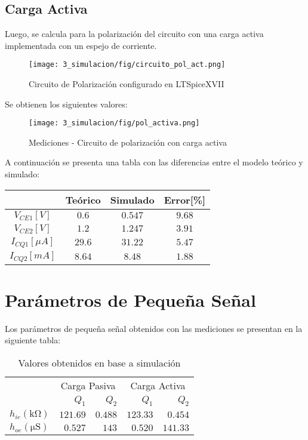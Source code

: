 \subsection{Carga Activa}

Luego, se calcula  para la polarización del circuito con una carga activa implementada con un espejo de corriente.

\begin{figure}[H]
    \centering
    \texttt{[image: 3\_simulacion/fig/circuito\_pol\_act.png]}
    \label{circuito_pol_activa}
    \caption{Circuito de Polarización configurado en LTSpiceXVII}
\end{figure}

Se obtienen los siguientes valores:

\begin{figure}[H]
    \centering
    \texttt{[image: 3\_simulacion/fig/pol\_activa.png]}
    \label{mediciones_pol_activa}
    \caption{Mediciones - Circuito de polarización con carga activa}
\end{figure}
A continuación se presenta una tabla con las diferencias entre el modelo teórico y simulado:

\begin{table}[H]
    \centering
    \begin{tabular}{|c|c|c|c|}
    \hline
                        & Teórico & Simulado & Error[\%] \\ \hline
    $V_{CE1}[V]$        & $0.6$   & $0.547$  & $9.68$    \\ \hline
    $V_{CE2}[V]$        & $1.2$   & $1.247$   & $3.91$   \\ \hline
    $I_{CQ1}[\mu A]$ & $29.6$  & $31.22$  & $5.47$   \\ \hline
    $I_{CQ2}[mA]$ & $8.64$  & $8.48$  & $1.88$   \\ \hline
    \end{tabular}
    \end{table}



\section{Parámetros de Pequeña Señal}
Los parámetros de pequeña señal obtenidos con las mediciones se presentan en la siguiente tabla:

\begin{table}[H]
    \centering
    \begin{tabular}{|l|r|r|r|r|}
        \hline
        \multirow{2}{*}{} & \multicolumn{2}{c|}{Carga Pasiva} & \multicolumn{2}{c|}{Carga Activa} \\ \cline{2-5} 
         & $Q_1$ & $Q_2$ & $Q_1$ & $Q_2$ \\ \hline
        $h_{ie} (\si{\kilo\ohm})$ & $121.69$ & $0.488$ & $123.33$ & $0.454$ \\
        $h_{oe} (\si{\micro\siemens})$ & $0.527$ & $143$ & $0.520$ & $141.33$ \\\hline
    \end{tabular}
    \caption{Valores  obtenidos en base a simulación}
    \label{tab:vals_teo_2}
\end{table}

